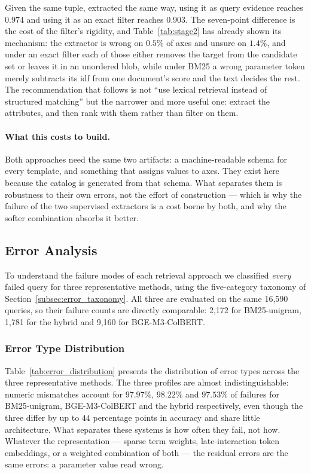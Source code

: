 \documentclass[preprint,review,12pt]{elsarticle}
\begin{document}
Given the same tuple, extracted the same way, using it as query evidence reaches $0.974$ and using it as an exact filter reaches $0.903$. The seven-point difference is the cost of the filter's rigidity, and Table~\ref{tab:stage2} has already shown its mechanism: the extractor is wrong on $0.5\%$ of axes and unsure on $1.4\%$, and under an exact filter each of those either removes the target from the candidate set or leaves it in an unordered blob, while under BM25 a wrong parameter token merely subtracts its idf from one document's score and the text decides the rest. The recommendation that follows is not ``use lexical retrieval instead of structured matching'' but the narrower and more useful one: extract the attributes, and then rank with them rather than filter on them.

\paragraph{What this costs to build.}
Both approaches need the same two artifacts: a machine-readable schema for every template, and something that assigns values to axes. They exist here because the catalog is generated from that schema. What separates them is robustness to their own errors, not the effort of construction --- which is why the failure of the two supervised extractors is a cost borne by both, and why the softer combination absorbs it better.

\subsection{Error Analysis}
\label{subsec:error_analysis}

To understand the failure modes of each retrieval approach we classified \emph{every} failed query for three representative methods, using the five-category taxonomy of Section~\ref{subsec:error_taxonomy}. All three are evaluated on the same 16,590 queries, so their failure counts are directly comparable: 2,172 for BM25-unigram, 1,781 for the hybrid and 9,160 for BGE-M3-ColBERT.

\subsubsection{Error Type Distribution}

Table~\ref{tab:error_distribution} presents the distribution of error types across the three representative methods. The three profiles are almost indistinguishable: numeric mismatches account for $97.97\%$, $98.22\%$ and $97.53\%$ of failures for BM25-unigram, BGE-M3-ColBERT and the hybrid respectively, even though the three differ by up to $44$ percentage points in accuracy and share little architecture. What separates these systems is how often they fail, not how. Whatever the representation --- sparse term weights, late-interaction token embeddings, or a weighted combination of both --- the residual errors are the same errors: a parameter value read wrong.
\end{document}
